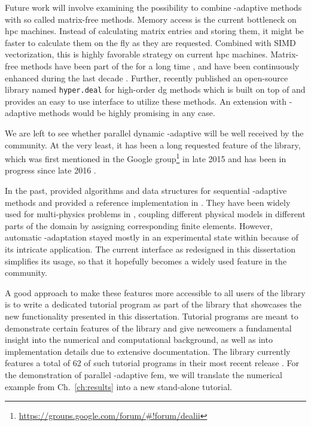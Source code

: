 Future work will involve examining the possibility to combine \hp-adaptive methods with so called matrix-free methods. Memory access is the current bottleneck on \gls{hpc} machines. Instead of calculating matrix entries and storing them, it might be faster to calculate them on the fly as they are requested. Combined with SIMD vectorization, this is highly favorable strategy on current \gls{hpc} machines. Matrix-free methods have been part of the \dealii{} for a long time \parencite{kronbichler2012}, and have been continuously enhanced during the last decade \parencite{kronbichler2019}. Further, \textcite{munch2020} recently published an open-source library named \texttt{hyper.deal} for high-order \gls{dg} methods which is built on top of \dealii{} and provides an easy to use interface to utilize these methods. An extension with \hp-adaptive methods would be highly promising in any case.


We are left to see whether parallel dynamic \hp-adaptive will be well received by the community. At the very least, it has been a long requested feature of the \dealii{} library, which was first mentioned in the \dealii{} Google group\footnote{\url{https://groups.google.com/forum/\#!forum/dealii}} in late 2015 and has been in progress since late 2016 \textcite{dealiiissue3511}.

In the past, \textcite{bangerth2009} provided algorithms and data structures for sequential \hp-adaptive methods and provided a reference implementation in \dealii{}. They have been widely used for multi-physics problems in \dealii{}, coupling different physical models in different parts of the domain by assigning corresponding finite elements. However, automatic \hp-adaptation stayed mostly in an experimental state within \dealii{} because of its intricate application. The current interface as redesigned in this dissertation simplifies its usage, so that it hopefully becomes a widely used feature in the community.

A good approach to make these features more accessible to all users of the library is to write a dedicated tutorial program as part of the \dealii{} library that showcases the new functionality presented in this dissertation. Tutorial programs are meant to demonstrate certain features of the library and give newcomers a fundamental insight into the numerical and computational background, as well as into implementation details due to extensive documentation. The \dealii{} library currently features a total of 62 of such tutorial programs in their most recent release \parencite{arndt2019}. For the demonstration of parallel \hp-adaptive \gls{fem}, we will translate the numerical example from Ch.~\ref{ch:results} into a new stand-alone tutorial.

